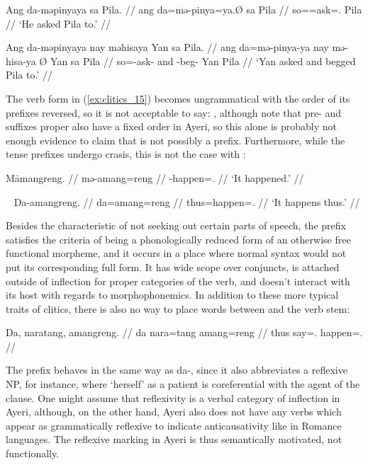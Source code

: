 \pex\label{ex:clitics_15}
\a\label{ex:clitics_15a}\begingl
	\gla Ang da-məpinyaya sa Pila. //
	\glb ang da=mə-pinya=ya.Ø sa Pila //
	\glc \AgtT{} so=\Pst{}=ask=\TsgM{}.\Top{} \Parg{} Pila //
	\glft `He asked Pila to.' //
\endgl

\a\label{ex:clitics_15b}\begingl
	\gla Ang da-məpinyaya nay məhisaya {} Yan sa Pila. //
	\glb ang da=mə-pinya-ya nay mə-hisa-ya Ø Yan sa Pila //
	\glc \AgtT{} so=\Pst{}-ask-\TsgM{} and \Pst{}-beg-\TsgM{} \Top{} Yan 
		\Parg{} Pila //
	\glft `Yan asked and begged Pila to.' //
\endgl
\xe

The verb form in (\ref{ex:clitics_15}) becomes ungrammatical with the order of
its prefixes reversed, so it is not acceptable to say: 
, although note that pre- and suffixes proper
also have a fixed order in Ayeri, so this alone is probably not enough evidence
to claim that  is not possibly a prefix. Furthermore, while the
tense prefixes undergo crasis, this is not the case with :

\pex\label{ex:clitics_17}
\a\label{ex:clitics_17a}\begingl
	\gla Māmangreng. //
	\glb mə-amang=reng //
	\glc \Pst{}-happen=\TsgI{}.\Aarg{} //
	\glft `It happened.' //
\endgl

\a\label{ex:clitics_17b}\ljudge{*} 
\xe

\pex~\label{ex:clitics_16}
\a\label{ex:clitics_16a}\begingl
	\gla Da-amangreng. //
	\glb da=amang=reng //
	\glc thus=happen=\TsgI{}.\Aarg{} //
	\glft `It happens thus.' //
\endgl

\a\label{ex:clitics_16b}\ljudge{*} 
\xe

Besides the characteristic of not seeking out certain parts of speech, the
 prefix satisfies the criteria of being a phonologically reduced
form of an otherwise free functional morpheme, and it occurs in a place where
normal syntax would not put its corresponding full form. It has wide scope over
conjuncts, is attached outside of inflection for proper categories of the verb,
and doesn't interact with its host with regards to morphophonemics. In addition
to these more typical traits of clitics, there is also no way to place words
between  and the verb stem:

\ex\label{ex:clitics_18}\begingl
	\gla Da, naratang, amangreng. //
	\glb da nara=tang amang=reng //
	\glc thus say=\TplM{}.\Aarg{} happen=\TsgI{}.\Aarg{} //
\endgl\xe

\label{clitics_preverb_refl}
The prefix  behaves in the same way as 
{da-}, since it also abbreviates a reflexive NP, for instance,
 where `herself' as a patient is
coreferential with the agent of the clause. One might assume that reflexivity
is a verbal category of inflection in Ayeri, although, on the other hand, Ayeri
also does not have any verbs which appear as grammatically reflexive to
indicate anticausativity like in Romance languages. The reflexive marking in
Ayeri is thus semantically motivated, not functionally.


